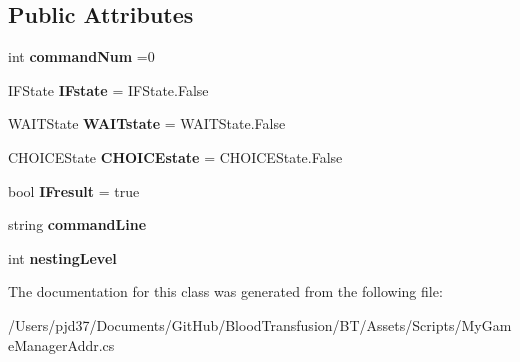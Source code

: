 \subsection*{Public Attributes}
\begin{DoxyCompactItemize}
\item 
int {\bfseries command\+Num} =0\hypertarget{class_little_brain_1_1_g_m_addr_1_1_command_sequence_a35c4bb7b05612de00d5c6e01a094f626}{}\label{class_little_brain_1_1_g_m_addr_1_1_command_sequence_a35c4bb7b05612de00d5c6e01a094f626}

\item 
I\+F\+State {\bfseries I\+Fstate} = I\+F\+State.\+False\hypertarget{class_little_brain_1_1_g_m_addr_1_1_command_sequence_a7af7b699d0171e6b40d28d7c051abd03}{}\label{class_little_brain_1_1_g_m_addr_1_1_command_sequence_a7af7b699d0171e6b40d28d7c051abd03}

\item 
W\+A\+I\+T\+State {\bfseries W\+A\+I\+Tstate} = W\+A\+I\+T\+State.\+False\hypertarget{class_little_brain_1_1_g_m_addr_1_1_command_sequence_aecda99c081f98d330c3f541a1d43c730}{}\label{class_little_brain_1_1_g_m_addr_1_1_command_sequence_aecda99c081f98d330c3f541a1d43c730}

\item 
C\+H\+O\+I\+C\+E\+State {\bfseries C\+H\+O\+I\+C\+Estate} = C\+H\+O\+I\+C\+E\+State.\+False\hypertarget{class_little_brain_1_1_g_m_addr_1_1_command_sequence_a46ccb992a5daf807840f8fb560d0f7cb}{}\label{class_little_brain_1_1_g_m_addr_1_1_command_sequence_a46ccb992a5daf807840f8fb560d0f7cb}

\item 
bool {\bfseries I\+Fresult} = true\hypertarget{class_little_brain_1_1_g_m_addr_1_1_command_sequence_a0f6747e461530b98269eba04d184ba87}{}\label{class_little_brain_1_1_g_m_addr_1_1_command_sequence_a0f6747e461530b98269eba04d184ba87}

\item 
string {\bfseries command\+Line}\hypertarget{class_little_brain_1_1_g_m_addr_1_1_command_sequence_ae653dd749edcf7dcf8f47a784f084649}{}\label{class_little_brain_1_1_g_m_addr_1_1_command_sequence_ae653dd749edcf7dcf8f47a784f084649}

\item 
int {\bfseries nesting\+Level}\hypertarget{class_little_brain_1_1_g_m_addr_1_1_command_sequence_a0450cdf9f07f92eb35c47d50e04d8351}{}\label{class_little_brain_1_1_g_m_addr_1_1_command_sequence_a0450cdf9f07f92eb35c47d50e04d8351}

\end{DoxyCompactItemize}


The documentation for this class was generated from the following file\+:\begin{DoxyCompactItemize}
\item 
/\+Users/pjd37/\+Documents/\+Git\+Hub/\+Blood\+Transfusion/\+B\+T/\+Assets/\+Scripts/My\+Game\+Manager\+Addr.\+cs\end{DoxyCompactItemize}
